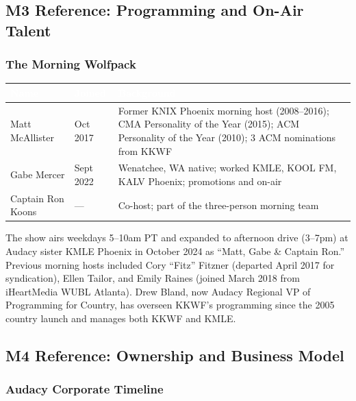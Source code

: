 \documentclass[11pt,letterpaper]{article}
\newcommand{\tableheader}[1]{\textbf{\sffamily\textcolor{white}{#1}}}
\begin{document}
\subsection{M3 Reference: Programming and On-Air Talent}

\subsubsection{The Morning Wolfpack}

\begin{center}
\begin{tabularx}{\textwidth}{L{2.5cm}L{2cm}X}
\toprule
{}
\tableheader{Name} & \tableheader{Joined} & \tableheader{Background} \\
\midrule
Matt McAllister & Oct 2017 & Former KNIX Phoenix morning host (2008--2016); CMA Personality of the Year (2015); ACM Personality of the Year (2010); 3 ACM nominations from KKWF \\
Gabe Mercer & Sept 2022 & Wenatchee, WA native; worked KMLE, KOOL FM, KALV Phoenix; promotions and on-air \\
Captain Ron Koons & --- & Co-host; part of the three-person morning team \\
\bottomrule
\end{tabularx}
\end{center}

The show airs weekdays 5--10am PT and expanded to afternoon drive (3--7pm) at Audacy sister KMLE Phoenix in October 2024 as ``Matt, Gabe \& Captain Ron.'' Previous morning hosts included Cory ``Fitz'' Fitzner (departed April 2017 for syndication), Ellen Tailor, and Emily Raines (joined March 2018 from iHeartMedia WUBL Atlanta). Drew Bland, now Audacy Regional VP of Programming for Country, has overseen KKWF's programming since the 2005 country launch and manages both KKWF and KMLE.

\subsection{M4 Reference: Ownership and Business Model}

\subsubsection{Audacy Corporate Timeline}
\end{document}
